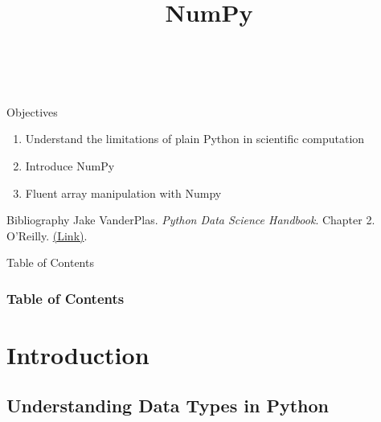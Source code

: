 \documentclass[10pt,compress]{beamer} %
\title[NumPy]{NumPy}
\author{\asignatura\\\carrera}
\institute{}
\date{}
\begin{document}
{\titlepageBlue
    \begin{frame}
        \titlepage
    \end{frame}
}

\institute{\asignatura}

\begin{frame}[plain]{}
	\begin{block}{Objectives}
		\begin{enumerate}
		\item Understand the limitations of plain Python in scientific computation
		\item Introduce NumPy
		\item Fluent array manipulation with Numpy
		\end{enumerate}
	\end{block}

   \begin{block}{Bibliography}
       Jake VanderPlas. \textit{Python Data Science Handbook}. Chapter 2. O'Reilly. \href{https://jakevdp.github.io/PythonDataScienceHandbook/}{(Link)}.
   \end{block}

\end{frame}

{
\begin{frame}[shrink]{Table of Contents}
 \frametitle{Table of Contents}
 \begin{multicols}{2}
 \tableofcontents
 \end{multicols}
\end{frame}
}

\section{Introduction}
\subsection{Understanding Data Types in Python}
\end{document}

